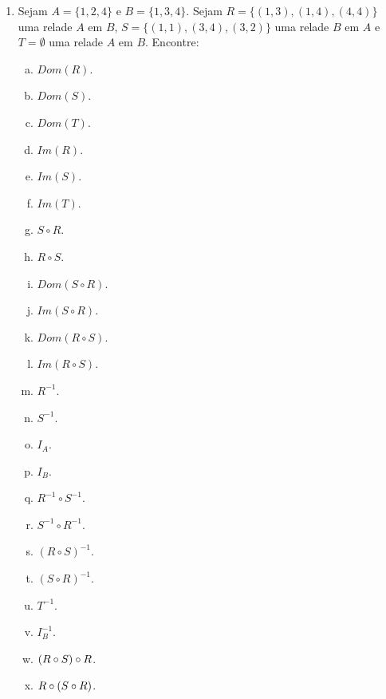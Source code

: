 \begin{enumerate}[{\bf 1.}]

\item Sejam $A=\{1,2,4\}$ e $B=\{1,3,4\}$. Sejam $R=\{(1,3),(1,4),(4,4)\}$ uma rela\cao de $A$ em $B$, $S=\{(1,1),(3,4),(3,2)\}$ uma rela\cao de $B$ em $A$ e $T=\emptyset$ uma rela\cao de $A$ em $B$. Encontre:
\begin{enumerate}[a)]
\item $Dom(R)$.
\item $Dom(S)$.
\item $Dom(T)$.
\item $Im(R)$.
\item $Im(S)$.
\item $Im(T)$.
\item $S\circ R$.
\item $R\circ S$.
\item $Dom(S\circ R)$.
\item $Im(S\circ R)$.
\item $Dom(R\circ S)$.
\item $Im(R\circ S)$.
\item $R^{-1}$.
\item $S^{-1}$.
\item $I_A$.
\item $I_B$.
\item $R^{-1}\circ S^{-1}$.
\item $S^{-1}\circ R^{-1}$.
\item $(R\circ S)^{-1}$.
\item $(S\circ R)^{-1}$.
\item $T^{-1}$.
\item $I_B^{-1}$.
\item $(R\circ S)\circ R$.
\item $R\circ(S\circ R)$. 
\end{enumerate}


\end{enumerate}
